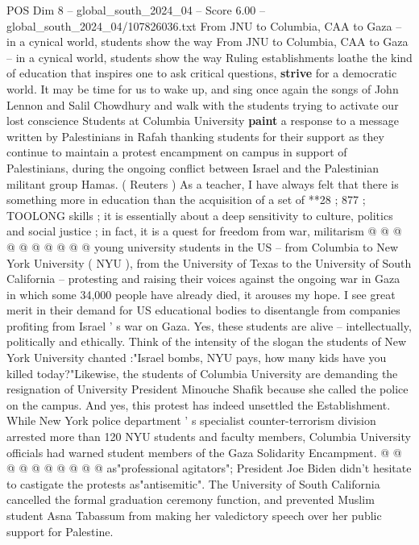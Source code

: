 \begin{textsample}{POS Dim 8 – global\_south\_2024\_04 – Score 6.00 – global\_south\_2024\_04/107826036.txt}  \label{ex:f8_pos_411}
From JNU to Columbia, CAA to Gaza -- in a cynical world, students show the way From JNU to Columbia, CAA to Gaza -- in a cynical world, students show the way Ruling establishments loathe the kind of education that inspires one to ask critical questions, \textbf{strive} for a democratic world.
It may be time for us to wake up, and sing once again the songs of John Lennon and Salil Chowdhury and walk with the students trying to activate our lost conscience Students at Columbia University \textbf{paint} a response to a message written by Palestinians in Rafah thanking students for their support as they continue to maintain a protest encampment on campus in support of Palestinians, during the ongoing conflict between Israel and the Palestinian militant group Hamas. ( Reuters ) As a teacher, I have always felt that there is something more in education than the acquisition of a set of **28 ; 877 ; TOOLONG skills ; it is essentially about a deep sensitivity to culture, politics and social justice ; in fact, it is a quest for freedom from war, militarism @ @ @ @ @ @ @ @ @ @ young university students in the US -- from Columbia to New York University ( NYU ), from the University of Texas to the University of South California -- protesting and raising their voices against the ongoing war in Gaza in which some 34,000 people have already died, it arouses my hope.
I see great merit in their demand for US educational bodies to disentangle from companies profiting from Israel ' s war on Gaza.
Yes, these students are alive -- intellectually, politically and ethically.
Think of the intensity of the slogan the students of New York University chanted :"Israel bombs, NYU pays, how many kids have you killed today?"Likewise, the students of Columbia University are demanding the resignation of University President Minouche Shafik because she called the police on the campus.
And yes, this protest has indeed unsettled the Establishment.
While New York police department ' s specialist counter-terrorism division arrested more than 120 NYU students and faculty members, Columbia University officials had warned student members of the Gaza Solidarity Encampment. @ @ @ @ @ @ @ @ @ @ as"professional agitators"; President Joe Biden didn't hesitate to castigate the protests as"antisemitic".
The University of South California cancelled the formal graduation ceremony function, and prevented Muslim student Asna Tabassum from making her valedictory speech over her public support for Palestine.

\end{textsample}
